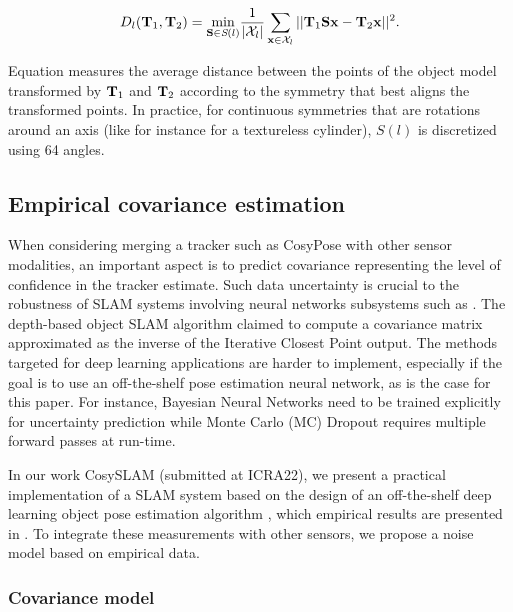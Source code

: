 \begin{equation}
    D_l({\bf T}_1, {\bf T}_2) = \underset{{\bf S} \in \textit{S}(l)}{\text{min}} \frac{1}{|\mathcal{X}_l|} \sum_{\mathbf{x} \in \mathcal{X}_l} ||{\bf T}_1 {\bf S} \mathbf{x} - {\bf T}_2\mathbf{x} ||^2.
    \label{eq:distSym}
\end{equation}

Equation  measures the average distance between the points of the object model transformed by ${\bf T}_1$ and ${\bf T}_2$ according to the symmetry 
that best aligns the transformed points. In practice, for continuous symmetries  that are rotations around an axis (like for instance for a textureless cylinder), 
$S(l)$ is discretized using 64 angles.


\subsection{Empirical covariance estimation}
\label{sec:cosypose_covariance}

When considering merging a tracker such as CosyPose with other sensor modalities, an important aspect is to predict covariance representing the level 
of confidence in the tracker estimate. Such data uncertainty is crucial to the robustness of SLAM systems involving neural networks 
subsystems such as \cite{yang2020d3vo}. The depth-based object SLAM algorithm \cite{SalasMoreno2013SLAMSL} claimed to compute a covariance matrix approximated 
as the inverse of the Iterative Closest Point output. The methods targeted for deep learning applications are harder to implement, especially if the goal 
is to use an off-the-shelf pose estimation neural network, as is the case for this paper. For instance, Bayesian Neural Networks \cite{jospin2020hands} 
need to be trained explicitly for uncertainty prediction while Monte Carlo (MC) Dropout \cite{gal2016dropout} requires multiple forward passes at run-time.

In our work CosySLAM \cite{debeunne2021cosyslam} (submitted at ICRA22), we present a practical implementation of a SLAM system based on the design of an off-the-shelf deep learning object 
pose estimation algorithm \cite{labbe2020cosypose}, which empirical results are presented in . 
To integrate these measurements with other sensors, we propose a noise model based on empirical data.

\subsubsection{Covariance model}

